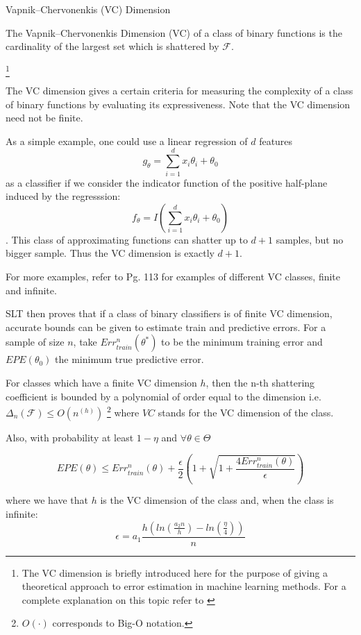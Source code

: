 \begin{definition}{Vapnik–Chervonenkis (VC) Dimension}
	
	The Vapnik–Chervonenkis Dimension (VC) of a class of binary functions is the cardinality of the largest set which is shattered by $\mathcal {F}$.
\end{definition}\footnote{The VC dimension is briefly introduced here for the purpose of giving a theoretical approach to error estimation in machine learning methods. For a complete explanation on this topic refer to \cite{vapnik-nature2013}}

The VC dimension gives a certain criteria for measuring the complexity of a class of binary functions by evaluating its expressiveness. Note that the VC dimension need not be finite.

As a simple example, one could use a linear regression of $d$ features $$g_{\theta} = \sum_{i=1}^d x_i \theta_i + \theta_0$$ as a classifier if we consider the indicator function of the positive half-plane induced by the regresssion: $$f_{\theta} = I(\sum_{i=1}^d x_i \theta_i + \theta_0)$$. This class of approximating functions can shatter up to $d+1$ samples, but no bigger sample. Thus the VC dimension is exactly $d+1$. 

For more examples, refer to \cite{cherkassky-learning2007} Pg. 113 for examples of different VC classes, finite and infinite.

SLT then proves that if a class of binary classifiers is of finite VC dimension, accurate bounds can be given to estimate train and predictive errors. For a sample of size $n$, take $Err^n_{train}(\theta^*)$ to be the minimum training error and $EPE(\theta_0)$ the minimum true predictive error. 

For classes which have a finite VC dimension $h$, then the n-th shattering coefficient is bounded by a polynomial of order equal to the dimension 
i.e. $\Delta_n(\mathcal {F}) \leq O(n^(h))$ \footnote{$O(\cdot)$ corresponds to Big-O notation.} where $VC$ stands for the VC dimension of the class.

Also, with probability at least $1 - \eta$ and $\forall \theta \in \Theta$

\begin{equation}\label{vapnik-classificationBound}
EPE(\theta) \leq  Err^n_{train}(\theta) + \frac{\epsilon}{2} \left(1 + \sqrt{1 + \frac{4 Err^n_{train}(\theta)  }{\epsilon}}  \right)    
\end{equation}

where we have that $h$ is the VC dimension of the class and, when the class is infinite: 
\begin{equation}\label{vapnik-epsilonBound}
\epsilon = a_1 \frac{h \left( ln(\frac{a_2 n}{h} ) -  ln(\frac{\eta}{4} ) \right)}{n}
\end{equation}

